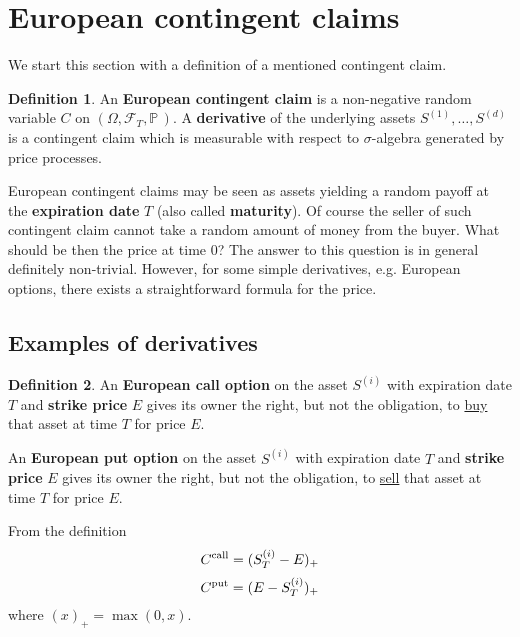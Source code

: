 \documentclass[a4paper,11pt, twoside]{book}
\theoremstyle{definition}
\newtheorem{mydef}{Definition}[chapter]
\theoremstyle{remark}
\def\P{{\mathbb{P}}\,}
\begin{document}
\section{European contingent claims}
\label{sec:ECC}
We start this section with a definition of a mentioned contingent claim.
\begin{mydef}
 \label{def:cc_eu}
 An \textbf{European contingent claim} is a non-negative random variable $C$ on $(\Omega, \mathcal{F}_T, \P)$. A \textbf{derivative} of the underlying assets $S^{(1)}, \ldots, S^{(d)}$ is a contingent claim which is measurable with respect to $\sigma$-algebra generated by price processes.
\end{mydef}
European contingent claims may be seen as assets yielding a random payoff at the \textbf{expiration date} $T$ (also called \textbf{maturity}). Of course the seller of such contingent claim cannot take a random amount of money from the buyer. What should be then the price at time $0$? The answer to this question is in general definitely non-trivial. However, for some simple derivatives, e.g. European options, there exists a straightforward formula for the price.

\subsection{Examples of derivatives}
\begin{mydef}
 An \textbf{European call option} on the asset $S^{(i)}$ with expiration date $T$ and \textbf{strike price} $E$ gives its owner the right, but not the obligation, to \underline{buy} that asset at time $T$ for price $E$.
 
 An \textbf{European put option} on the asset $S^{(i)}$ with expiration date $T$ and \textbf{strike price} $E$ gives its owner the right, but not the obligation, to \underline{sell} that asset at time $T$ for price $E$.
\end{mydef}
From the definition
\begin{equation}
 \label{eq:ecall}
 C\textsuperscript{call} = (S^{(i)}_T - E)_+
\end{equation}
\begin{equation}
 \label{eq:eput}
 C\textsuperscript{put} = (E - S^{(i)}_T )_+
\end{equation}
where $(x)_+ = \max(0,x)$.
\end{document}
